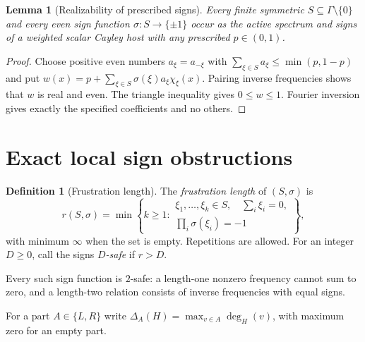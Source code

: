 \documentclass[11pt]{article}
\numberwithin{equation}{section}
\newtheorem{lemma}[theorem]{Lemma}
\theoremstyle{definition}
\newtheorem{definition}[theorem]{Definition}
\theoremstyle{remark}
\begin{document}
\begin{lemma}[Realizability of prescribed signs]
\label{lem:realizable}
Every finite symmetric $S\subseteq\Gamma\setminus\{0\}$ and every even
sign function $\sigma:S\to\{\pm1\}$ occur as the active spectrum and
signs of a weighted scalar Cayley host with any prescribed
$p\in(0,1)$.
\end{lemma}
\begin{proof}
Choose positive even numbers $a_\xi=a_{-\xi}$ with
$\sum_{\xi\in S}a_\xi\leq\min(p,1-p)$ and put
$w(x)=p+\sum_{\xi\in S}\sigma(\xi)a_\xi\chi_\xi(x)$.
Pairing inverse frequencies shows that $w$ is real and even. The triangle
inequality gives $0\leq w\leq1$. Fourier inversion gives exactly the
specified coefficients and no others.
\end{proof}

\section{Exact local sign obstructions}
\label{sec:signs}

\begin{definition}[Frustration length]
The \emph{frustration length} of $(S,\sigma)$ is
\begin{equation}
 r(S,\sigma)=\min\left\{k\geq1:
  \begin{array}{l}
   \xi_1,\ldots,\xi_k\in S,\quad \sum_i\xi_i=0,\\[-2pt]
   \prod_i\sigma(\xi_i)=-1
  \end{array}\right\},
 \label{eq:frustration}
\end{equation}
with minimum $\infty$ when the set is empty. Repetitions are allowed.
For an integer $D\geq0$, call the signs \emph{$D$-safe} if $r>D$.
\end{definition}

Every such sign function is $2$-safe: a length-one nonzero frequency
cannot sum to zero, and a length-two relation consists of inverse
frequencies with equal signs.

For a part $A\in\{L,R\}$ write
$\Delta_A(H)=\max_{v\in A}\deg_H(v)$, with maximum zero for an empty
part.
\end{document}
